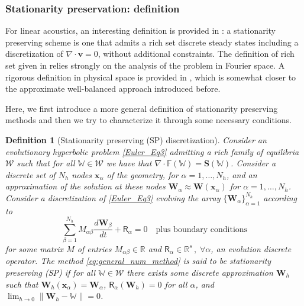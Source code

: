 \documentclass[a4paper,10pt]{article}
\newtheorem{definition}[theorem]{Definition}
\begin{document}
 

   


 

\subsubsection{Stationarity preservation: definition}
For  linear   acoustics, an interesting definition is provided in \cite{barsukow17a}:   a stationarity preserving scheme is 
one that admits   a rich set  discrete steady states including a  discretization of $\nabla \cdot \mathbf{v} = 0$, 
without additional constraints.     
The definition of rich set given in  \cite{barsukow17a} relies strongly on the analysis of the problem in Fourier space. 
A rigorous definition  in physical  space is provided in \cite{Barsukow_nodeconservative2025},   which is somewhat 
closer to the approximate well-balanced approach introduced before.

Here, we first introduce a more general definition of stationarity preserving methods and then we try to characterize it through some necessary conditions.

\begin{definition}[Stationarity preserving (SP) discretization]\label{def:SP_original}
  Consider an evolutionary hyperbolic problem \eqref{Euler_Eq3} admitting a rich family of equilibria $\mathcal{W}$ such that for all $\mathbb W \in \mathcal{W}$ we have that $\nabla \cdot \mathbb{F}(\mathbb W) = \mathbf{S}(\mathbb W)$.
  Consider a discrete set of $N_h$ nodes $\mathbf{x}_\alpha$ of the geometry, for $\alpha =1,\dots, N_h$, and an approximation of the solution 
  at these nodes $\mathbf{W}_\alpha  \approx \mathbf{W}(\mathbf{x}_\alpha)$ for $\alpha = 1,\dots, N_h$.
  Consider a discretization of \eqref{Euler_Eq3} evolving the array $\lbrace \mathbf{W}_\alpha \rbrace_{\alpha=1}^{N_h}$ according to
  \begin{equation}\label{eq:general_num_method}
  \sum_{\beta =1}^{N_h} M_{\alpha \beta} \dfrac{d\bm{W}_\beta }{dt} + \mathsf{R}_\alpha =0 \quad\text{plus boundary conditions}
  \end{equation}
  for some %
matrix  $M$ of entries $M_{\alpha \beta}\in \mathbb R$ and $\mathsf{R}_\alpha \in \mathbb R^{s}\,,\; \forall \alpha$, an evolution discrete operator.
The method \eqref{eq:general_num_method} is said to be \emph{stationarity preserving} (SP) if for all $\mathbb W \in \mathcal{W}$ there exists some discrete
approximation $\mathbf W_h$ such that $\mathbf{W}_h(\mathbf{x}_\alpha)=\mathbf{W}_\alpha$, 
 $\mathsf{R}_\alpha(\mathbf W_h) =0$ for all $\alpha$, and $\lim_{h\to 0} \lVert \mathbf W_h - \mathbb W \rVert = 0$.
\end{definition}
\end{document}
